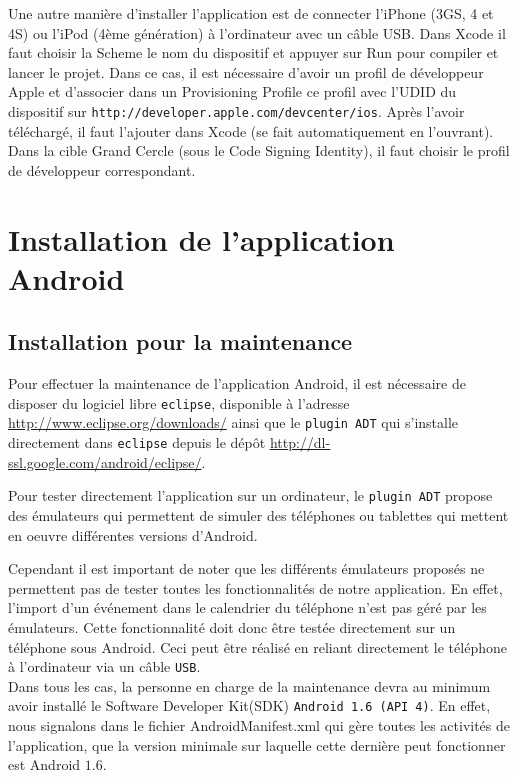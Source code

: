 \documentclass[a4paper, 11px]{article}
\begin{document}
Une autre manière d'installer l'application est de connecter l'iPhone (3GS, 4 et 4S) ou l'iPod (4ème génération) à l'ordinateur avec un câble USB. Dans Xcode il faut choisir la \og Scheme \fg le nom du dispositif et appuyer sur Run pour compiler et lancer le projet.
Dans ce cas, il est nécessaire d'avoir un profil de développeur Apple et d'associer dans un Provisioning Profile ce profil avec l'UDID du dispositif sur \texttt{http://developer.apple.com/devcenter/ios}. Après l'avoir téléchargé, il faut l'ajouter dans Xcode (se fait automatiquement en l'ouvrant). Dans la cible Grand Cercle (sous le Code Signing Identity), il faut choisir le profil de développeur correspondant.


\section{Installation de l'application Android}
\subsection{Installation pour la maintenance}
Pour effectuer la maintenance de l'application Android, il est nécessaire de disposer du logiciel libre \texttt{eclipse}, disponible à l'adresse \href{http://www.eclipse.org/downloads/}{http://www.eclipse.org/downloads/} ainsi que le \texttt{plugin ADT} qui s'installe directement dans \texttt{eclipse} depuis le dépôt \href{http://dl-ssl.google.com/android/eclipse/}{http://dl-ssl.google.com/android/eclipse/}.

Pour tester directement l'application sur un ordinateur, le \texttt{plugin ADT} propose des émulateurs qui permettent de simuler des téléphones ou tablettes qui mettent en oeuvre différentes versions d'Android.

Cependant il est important de noter que les différents émulateurs proposés ne permettent pas de tester toutes les fonctionnalités de notre application. En effet, l'import d'un événement dans le calendrier du téléphone n'est pas géré par les émulateurs. Cette fonctionnalité doit donc être testée directement sur un téléphone sous Android. Ceci peut être réalisé en reliant directement le téléphone à l'ordinateur via un câble \texttt{USB}.\\

Dans tous les cas, la personne en charge de la maintenance devra au minimum avoir installé le Software Developer Kit(SDK) \texttt{Android 1.6 (API 4)}. En effet, nous signalons dans le fichier AndroidManifest.xml qui gère toutes les activités de l'application, que la version minimale sur laquelle cette dernière peut fonctionner est Android $1.6$.\\
\end{document}
